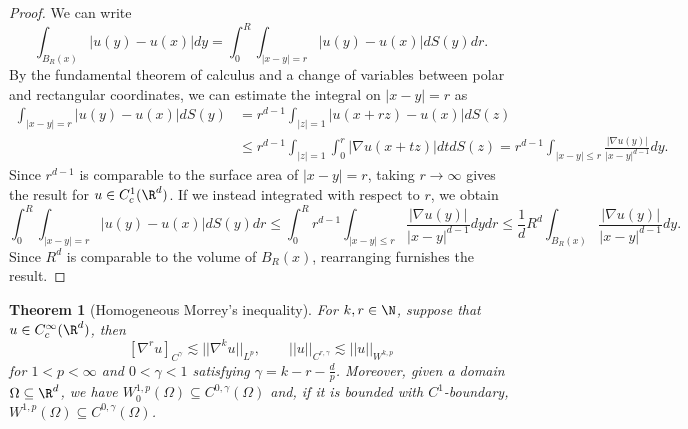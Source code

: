 \documentclass[reqno]{amsart}
\newtheorem{theorem}{Theorem}
\theoremstyle{definition}
\theoremstyle{remark}
\begin{document}
\begin{proof}
	We can write
		\[  \int_{B_R (x)} |u(y) - u(x)| dy  = \int_0^R \int_{|x - y| = r} |u(y) - u(x)| dS(y) d r. \]
	By the fundamental theorem of calculus and a change of variables between polar and rectangular coordinates, we can estimate the integral on $|x - y| = r$ as
		\begin{align*}
			 \int_{|x - y| = r} |u(y) - u(x)| dS(y) 
			 	&= r^{d - 1} \int_{|z| = 1} |u(x + rz) - u(x)| dS(z) \\
			 	&\leq r^{d - 1} \int_{|z| = 1} \int_0^r |\nabla u (x + tz) | dt dS(z) = r^{d - 1} \int_{|x - y| \leq r} \frac{|\nabla u(y)|}{|x - y|^{d - 1}} dy. 		 	
		\end{align*}	
	Since $r^{d - 1}$ is comparable to the surface area of $|x - y| = r$, taking $r \to \infty$ gives the result for $u \in C^1_c (\R^d)$. If we instead integrated with respect to $r$, we obtain
		\[ \int_0^R \int_{|x - y| = r} |u(y) - u(x)| dS(y) d r \leq \int_0^R r^{d - 1} \int_{|x - y| \leq r} \frac{|\nabla u(y)|}{|x - y|^{d - 1}} dy dr\leq \frac1d R^d \int_{B_R (x)} \frac{|\nabla u(y)|}{|x - y|^{d - 1}} dy. \]	
	Since $R^d$ is comparable to the volume of $B_R (x)$, rearranging furnishes the result. 	
\end{proof}

\begin{theorem}[Homogeneous Morrey's inequality]
	For $k,r \in\N$, suppose that $u \in C^\infty_c (\R^d)$, then 
		\[ [\nabla^r u]_{C^\gamma} \lesssim || \nabla^k u||_{L^p}, \qquad  ||u||_{C^{r, \gamma}} \lesssim ||u||_{W^{k, p}} \]
	for $1 < p < \infty$ and $0 < \gamma < 1$ satisfying $\gamma = k - r - \tfrac{d}{p}$. Moreover, given a domain $\Omega \subseteq \R^d$, we have $W^{1, p}_0 (\Omega) \subseteq C^{0, \gamma} (\Omega)$ and, if it is bounded with $C^1$-boundary, $W^{1, p} (\Omega) \subseteq C^{0, \gamma} (\Omega)$.
\end{theorem}
\end{document}
